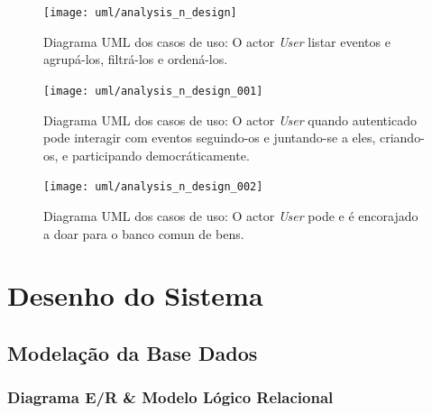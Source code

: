 \documentclass[12pt,a4paper,openright,oneside]{memoir}
\begin{document}

\begin{figure}[H]
  \centering
  \texttt{[image: uml/analysis\_n\_design]}
    \caption{Diagrama UML dos casos de uso: O actor \textit{User} listar
    eventos e agrupá-los, filtrá-los e ordená-los.}
  \label{fig:use_cases_list_event}
\end{figure}
\begin{figure}[H]
  \centering
  \texttt{[image: uml/analysis\_n\_design\_001]}
    \caption{Diagrama UML dos casos de uso: O actor \textit{User} quando
    autenticado pode interagir com eventos seguindo-os e juntando-se a eles,
    criando-os, e participando democráticamente.}
    \label{fig:use_cases_interact_event}
\end{figure}
\begin{figure}[H]
  \centering
  \texttt{[image: uml/analysis\_n\_design\_002]}
  \caption{Diagrama UML dos casos de uso: O actor \textit{User} pode e é
    encorajado a doar para o banco comun de bens.}
  \label{fig:use_cases_add_bank}
\end{figure}

\section{Desenho do Sistema}
\label{ch:design}


\subsection{Modelação da Base Dados}


\subsubsection{Diagrama E/R \& Modelo Lógico Relacional}
\end{document}
